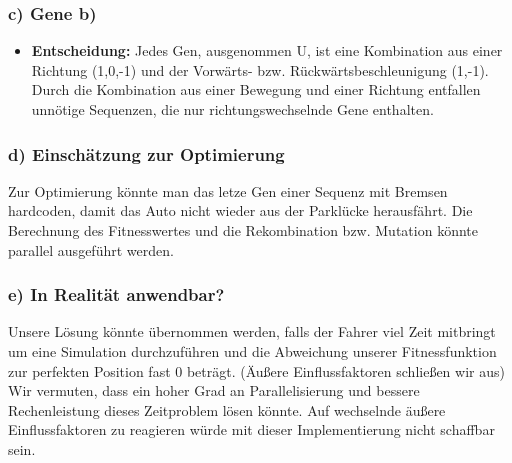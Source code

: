 \documentclass{beamer}
\begin{document}
\begin{frame}
  \frametitle{\textbf{c)} Gene b)}
  \begin{itemize}
    
    \item \textbf{Entscheidung:} Jedes Gen, ausgenommen U, ist eine Kombination aus einer Richtung (1,0,-1) und der Vorwärts- bzw. R\"uckw\"artsbeschleunigung (1,-1). Durch die Kombination aus einer Bewegung und einer Richtung entfallen unnötige Sequenzen, die nur richtungswechselnde Gene enthalten.
  \end{itemize}
\end{frame}

\begin{frame}
  \frametitle{\textbf{d)} Einsch\"atzung zur Optimierung}
  Zur Optimierung könnte man das letze Gen einer Sequenz mit Bremsen hardcoden, damit das Auto nicht wieder aus der Parklücke herausfährt.
  Die Berechnung des Fitnesswertes und die Rekombination bzw. Mutation könnte parallel ausgeführt werden.
\end{frame}

\begin{frame}
  \frametitle{\textbf{e)} In Realit\"at anwendbar?}
  Unsere Lösung könnte übernommen werden, falls der Fahrer viel Zeit mitbringt um eine Simulation durchzuführen und die Abweichung unserer Fitnessfunktion zur perfekten Position fast 0 beträgt. (Äußere Einflussfaktoren schließen wir aus)\newline
Wir vermuten, dass ein hoher Grad an Parallelisierung und bessere Rechenleistung dieses Zeitproblem lösen könnte. 
 Auf wechselnde äußere Einflussfaktoren zu reagieren würde mit dieser Implementierung nicht schaffbar sein.
\end{frame}
\end{document}
